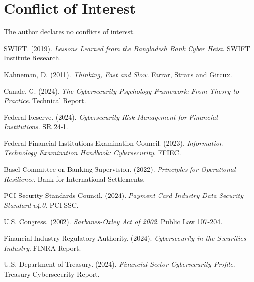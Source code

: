 \documentclass[10pt, twocolumn]{article}
\begin{document}
\section*{Conflict of Interest}

The author declares no conflicts of interest.

\begin{thebibliography}{99}

SWIFT. (2019). \textit{Lessons Learned from the Bangladesh Bank Cyber Heist}. SWIFT Institute Research.

Kahneman, D. (2011). \textit{Thinking, Fast and Slow}. Farrar, Straus and Giroux.

Canale, G. (2024). \textit{The Cybersecurity Psychology Framework: From Theory to Practice}. Technical Report.

Federal Reserve. (2024). \textit{Cybersecurity Risk Management for Financial Institutions}. SR 24-1.

Federal Financial Institutions Examination Council. (2023). \textit{Information Technology Examination Handbook: Cybersecurity}. FFIEC.

Basel Committee on Banking Supervision. (2022). \textit{Principles for Operational Resilience}. Bank for International Settlements.

PCI Security Standards Council. (2024). \textit{Payment Card Industry Data Security Standard v4.0}. PCI SSC.

U.S. Congress. (2002). \textit{Sarbanes-Oxley Act of 2002}. Public Law 107-204.

Financial Industry Regulatory Authority. (2024). \textit{Cybersecurity in the Securities Industry}. FINRA Report.

U.S. Department of Treasury. (2024). \textit{Financial Sector Cybersecurity Profile}. Treasury Cybersecurity Report.

\end{thebibliography}
\end{document}
